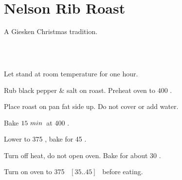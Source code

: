 \section{Nelson Rib Roast}


\begin{recipestats}[
	servings=$2\;person \; / \; 1 \; lb$,
	preptime=1~\onefourth~\hour,
	bakingtime=2~\onefourth~\hour,
	source=Ralph Nelson (Fa),
]
\end{recipestats}


\begin{recipeabstract}
	A Giesken Christmas tradition.
\end{recipeabstract}

\begin{ingredientcolumns}[1]
	\begin{ingredientblock}
		\\
		\\
	\end{ingredientblock}
\end{ingredientcolumns}

\begin{preparation}
\item Let stand at room temperature for one hour.

\item Rub black pepper \& salt on roast. Preheat oven to $400$ \Fahrenheit.

\item Place roast on pan fat side up. Do not cover or add water.

\item Bake $15~\minute$~at 400 \Fahrenheit.

\item Lower to 375 \Fahrenheit, bake for 45 \minute.

\item Turn off heat, do not open oven. Bake for about 30 \minute.


\item Turn on oven to 375 \Fahrenheit~$[35..45]$ \minute~before eating.
\end{preparation}

\recipeend%
